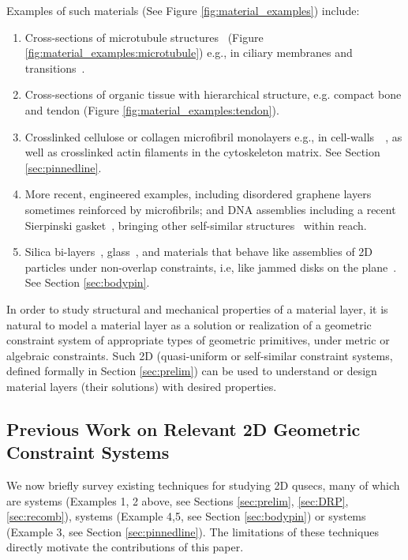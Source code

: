 Examples of such materials (See Figure \ref{fig:material_examples})
include:
%
\begin{enumerate}
    \item \label{materialexample1} Cross-sections of microtubule structures~\cite{microtubule_necklace} (Figure \ref{fig:material_examples:microtubule}) e.g., in ciliary membranes and transitions~\cite{microtubule_cilia}.

    \item \label{materialexample2} Cross-sections of organic tissue with hierarchical structure, e.g. compact bone and tendon (Figure \ref{fig:material_examples:tendon}).

    \item \label{materialexample3} Crosslinked cellulose or collagen microfibril monolayers e.g., in cell-walls~\cite{wikimediacommons2010afm}~\cite{wikimediacommons2007plant}, as well as crosslinked actin filaments in the cytoskeleton matrix. See Section \ref{sec:pinnedline}.

    \item \label{materialexample4} More recent, engineered examples, including disordered graphene layers~\cite{Graphene1}~\cite{Graphene2} sometimes reinforced by microfibrils; and DNA assemblies including a recent Sierpinski gasket~\cite{self_assembly_sierpinski}, bringing other self-similar structures~\cite{wikimediacommons2012subdivision} within reach.

    \item \label{materialexample5} Silica bi-layers~\cite{silica_bilayers}, glass~\cite{sructure_of_2d_glass}, and materials that behave like assemblies of 2D particles under non-overlap constraints, i.e, like jammed disks on the plane~\cite{jammed_disks}. See Section \ref{sec:bodypin}.
\end{enumerate}
%
In order to study structural and mechanical properties of a material layer, it is natural to model a material layer as a solution or realization of a geometric constraint system of appropriate types of geometric primitives, under metric or algebraic constraints. Such 2D  (quasi-uniform or self-similar constraint systems, defined formally in Section \ref{sec:prelim}) can be used to understand or design material layers (their solutions) with desired properties.
%
\subsection{Previous Work on Relevant 2D Geometric Constraint Systems}
We now briefly survey existing techniques for studying 2D qusecs,  many of which are  systems (Examples 1, 2 above, see Sections \ref{sec:prelim}, \ref{sec:DRP}, \ref{sec:recomb}),  systems (Example 4,5, see Section \ref{sec:bodypin}) or  systems (Example 3, see Section \ref{sec:pinnedline}). The limitations of these techniques directly motivate the contributions of this paper.

